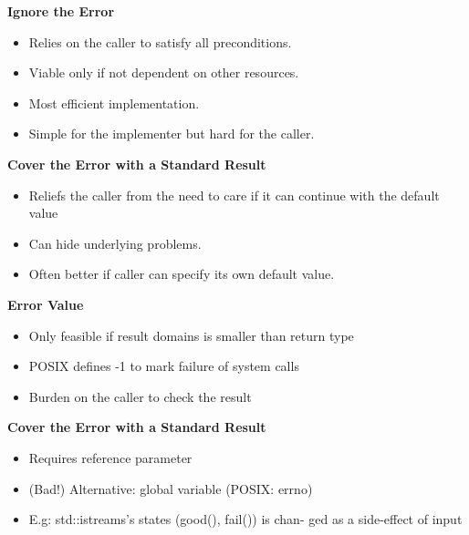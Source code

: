 \begin{minipage}{0,5\linewidth}
	\textbf{Ignore the Error}
		\begin{itemize}
  			\itemsep -0.5em 
  			\item Relies on the caller to satisfy all preconditions.
  			\item Viable only if not dependent on other resources.
  				\item Most efficient implementation.
  		\item Simple for the implementer but hard for the caller.
		\end{itemize}
	\textbf{Cover the Error with a Standard Result}
		\begin{itemize}
  			\itemsep -0.5em 
  			\item Reliefs the caller from the need to care if it can continue with the default value
  			\item Can hide underlying problems.
  			\item Often better if caller can specify its own default value.
		\end{itemize}
\end{minipage}
\begin{minipage}{0,5\linewidth}
  	\textbf{Error Value} 
  		\begin{itemize}
 			\itemsep -0.5em 
  			\item Only feasible if result domains is smaller than return type
  			\item POSIX defines -1 to mark failure of system calls
  			\item Burden on the caller to check the result
		\end{itemize}
	\textbf{Cover the Error with a Standard Result}  
		\begin{itemize}
  			\itemsep -0.5em
  			\item Requires reference parameter
  			\item (Bad!) Alternative: global variable (POSIX: errno)
  			\item E.g: std::istreams’s states (good(), fail()) is chan- ged as a side-effect of input
		\end{itemize}
\end{minipage}


